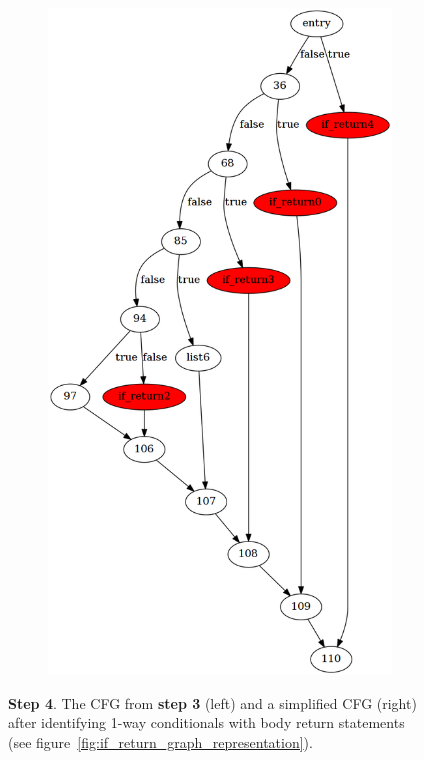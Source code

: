 \begin{figure}[htbp]
\begin{subfigure}[ht]{0.45\textwidth}
		\includegraphics[width=\textwidth]{inc/appendices/control_flow_analysis_example/step4_after.png}
	\end{subfigure}
	\caption{\textbf{Step 4}. The CFG from \textbf{step 3} (left) and a simplified CFG (right) after identifying 1-way conditionals with body return statements (see figure~\ref{fig:if_return_graph_representation}).}
	\label{fig:step_4}
\end{figure}

